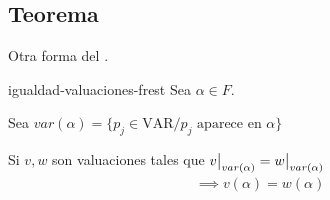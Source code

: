 \subsection{Teorema}
Otra forma del .
\begin{teorema}{}{igualdad-valuaciones-frest}
    Sea $\alpha \in F$. 

    Sea $var(\alpha) = 
    \{ p_j \in \mathrm{VAR} / p_j \text{ aparece en } \alpha \}$

    \medskip

    Si $v, w$ son valuaciones tales que 
    $\frest{v}{var(\alpha)} = \frest{w}{var(\alpha)}$
    \begin{gather*}
        \implies v(\alpha) = w(\alpha)
    \end{gather*}

\end{teorema}

